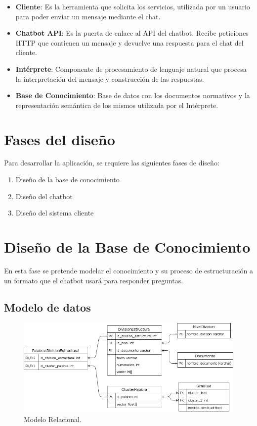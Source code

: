 \begin{itemize}
    \item \textbf{Cliente}: Es la herramienta que solicita los servicios, utilizada por un usuario para poder enviar un mensaje mediante el chat.
    \item \textbf{Chatbot API}: Es la puerta de enlace al API del chatbot. Recibe peticiones HTTP que contienen un mensaje y devuelve una respuesta para el chat del cliente.
    \item \textbf{Intérprete}: Componente de procesamiento de lenguaje natural que procesa la interpretación del mensaje y construcción de las respuestas.
    \item \textbf{Base de Conocimiento}: Base de datos con los documentos normativos y la representación semántica de los mismos utilizada por el Intérprete.
\end{itemize}

\section{Fases del diseño}

Para desarrollar la aplicación, se requiere las siguientes fases de diseño:

\begin{enumerate}
    \item Diseño de la base de conocimiento
    \item Diseño del chatbot
    \item Diseño del sistema cliente
\end{enumerate}


\section{Diseño de la Base de Conocimiento}

En esta fase se pretende modelar el conocimiento y su proceso de estructuración a un formato que el chatbot usará para responder preguntas.

\subsection{Modelo de datos}

\begin{figure}[ht]
    \centering
    \includegraphics[scale=0.55]{images/5/diagrama-relacional.png}
    \caption{Modelo Relacional.}
    \label{fig:diagrama-relacional}
\end{figure}

